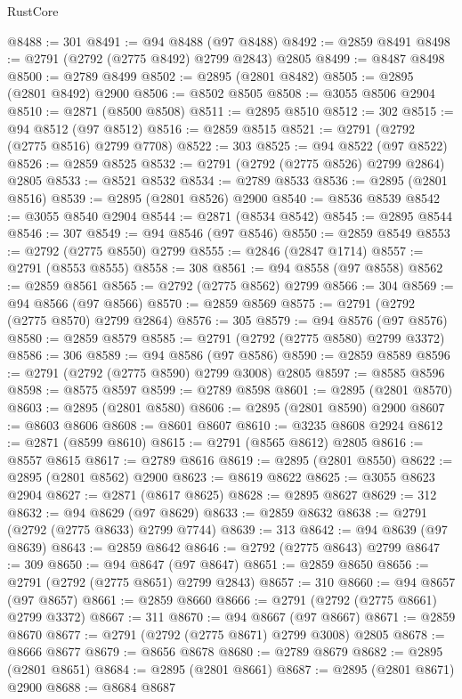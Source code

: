 \begin{lexlean}{RustCore}
\begin{coremodule}
@8488 := 301
@8491 := @94 @8488 (@97 @8488)
@8492 := @2859 @8491
@8498 := @2791 (@2792 (@2775 @8492) @2799 @2843) @2805
@8499 := @8487 @8498
@8500 := @2789 @8499
@8502 := @2895 (@2801 @8482)
@8505 := @2895 (@2801 @8492) @2900
@8506 := @8502 @8505
@8508 := @3055 @8506 @2904
@8510 := @2871 (@8500 @8508)
@8511 := @2895 @8510
@8512 := 302
@8515 := @94 @8512 (@97 @8512)
@8516 := @2859 @8515
@8521 := @2791 (@2792 (@2775 @8516) @2799 @7708)
@8522 := 303
@8525 := @94 @8522 (@97 @8522)
@8526 := @2859 @8525
@8532 := @2791 (@2792 (@2775 @8526) @2799 @2864) @2805
@8533 := @8521 @8532
@8534 := @2789 @8533
@8536 := @2895 (@2801 @8516)
@8539 := @2895 (@2801 @8526) @2900
@8540 := @8536 @8539
@8542 := @3055 @8540 @2904
@8544 := @2871 (@8534 @8542)
@8545 := @2895 @8544
@8546 := 307
@8549 := @94 @8546 (@97 @8546)
@8550 := @2859 @8549
@8553 := @2792 (@2775 @8550) @2799
@8555 := @2846 (@2847 @1714)
@8557 := @2791 (@8553 @8555)
@8558 := 308
@8561 := @94 @8558 (@97 @8558)
@8562 := @2859 @8561
@8565 := @2792 (@2775 @8562) @2799
@8566 := 304
@8569 := @94 @8566 (@97 @8566)
@8570 := @2859 @8569
@8575 := @2791 (@2792 (@2775 @8570) @2799 @2864)
@8576 := 305
@8579 := @94 @8576 (@97 @8576)
@8580 := @2859 @8579
@8585 := @2791 (@2792 (@2775 @8580) @2799 @3372)
@8586 := 306
@8589 := @94 @8586 (@97 @8586)
@8590 := @2859 @8589
@8596 := @2791 (@2792 (@2775 @8590) @2799 @3008) @2805
@8597 := @8585 @8596
@8598 := @8575 @8597
@8599 := @2789 @8598
@8601 := @2895 (@2801 @8570)
@8603 := @2895 (@2801 @8580)
@8606 := @2895 (@2801 @8590) @2900
@8607 := @8603 @8606
@8608 := @8601 @8607
@8610 := @3235 @8608 @2924
@8612 := @2871 (@8599 @8610)
@8615 := @2791 (@8565 @8612) @2805
@8616 := @8557 @8615
@8617 := @2789 @8616
@8619 := @2895 (@2801 @8550)
@8622 := @2895 (@2801 @8562) @2900
@8623 := @8619 @8622
@8625 := @3055 @8623 @2904
@8627 := @2871 (@8617 @8625)
@8628 := @2895 @8627
@8629 := 312
@8632 := @94 @8629 (@97 @8629)
@8633 := @2859 @8632
@8638 := @2791 (@2792 (@2775 @8633) @2799 @7744)
@8639 := 313
@8642 := @94 @8639 (@97 @8639)
@8643 := @2859 @8642
@8646 := @2792 (@2775 @8643) @2799
@8647 := 309
@8650 := @94 @8647 (@97 @8647)
@8651 := @2859 @8650
@8656 := @2791 (@2792 (@2775 @8651) @2799 @2843)
@8657 := 310
@8660 := @94 @8657 (@97 @8657)
@8661 := @2859 @8660
@8666 := @2791 (@2792 (@2775 @8661) @2799 @3372)
@8667 := 311
@8670 := @94 @8667 (@97 @8667)
@8671 := @2859 @8670
@8677 := @2791 (@2792 (@2775 @8671) @2799 @3008) @2805
@8678 := @8666 @8677
@8679 := @8656 @8678
@8680 := @2789 @8679
@8682 := @2895 (@2801 @8651)
@8684 := @2895 (@2801 @8661)
@8687 := @2895 (@2801 @8671) @2900
@8688 := @8684 @8687

\end{coremodule}
\end{lexlean}
